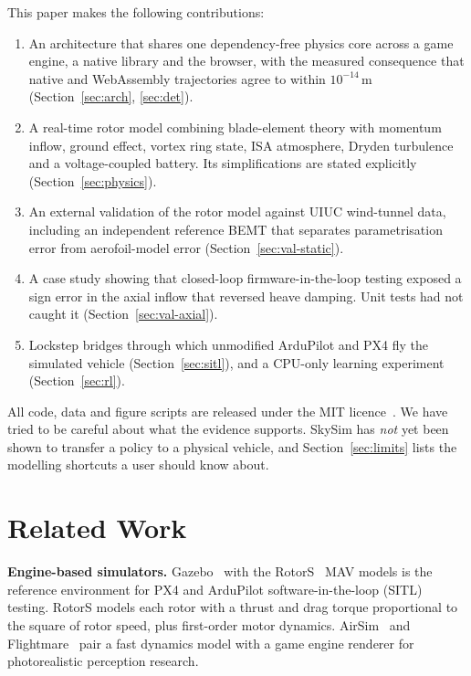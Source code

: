 \documentclass{ieeeaccess}
\newcommand{\skysim}{SkySim\xspace}
\begin{document}
This paper makes the following contributions:
\begin{enumerate}
\item An architecture that shares one dependency-free physics core across a game
engine, a native library and the browser, with the measured consequence that
native and WebAssembly trajectories agree to within $10^{-14}$\,m
(Section~\ref{sec:arch}, \ref{sec:det}).
\item A real-time rotor model combining blade-element theory with momentum
inflow, ground effect, vortex ring state, ISA atmosphere, Dryden turbulence and a
voltage-coupled battery. Its simplifications are stated explicitly
(Section~\ref{sec:physics}).
\item An external validation of the rotor model against UIUC wind-tunnel data,
including an independent reference BEMT that separates parametrisation error
from aerofoil-model error (Section~\ref{sec:val-static}).
\item A case study showing that closed-loop firmware-in-the-loop testing exposed
a sign error in the axial inflow that reversed heave damping. Unit tests had not
caught it (Section~\ref{sec:val-axial}).
\item Lockstep bridges through which unmodified ArduPilot and PX4 fly the
simulated vehicle (Section~\ref{sec:sitl}), and a CPU-only learning experiment
(Section~\ref{sec:rl}).
\end{enumerate}

All code, data and figure scripts are released under the MIT
licence~\cite{skysimrepo}. We have tried to be careful about what the evidence
supports. \skysim has \emph{not} yet been shown to transfer a policy to a
physical vehicle, and Section~\ref{sec:limits} lists the modelling shortcuts a
user should know about.

\section{Related Work}
\label{sec:related}

\textbf{Engine-based simulators.} Gazebo~\cite{koenig2004gazebo} with the
RotorS~\cite{furrer2016rotors} MAV models is the reference environment for
PX4 and ArduPilot software-in-the-loop (SITL) testing. RotorS models each rotor
with a thrust and drag torque proportional to the square of rotor speed, plus
first-order motor dynamics. AirSim~\cite{shah2018airsim} and
Flightmare~\cite{song2020flightmare} pair a fast dynamics model with a game
engine renderer for photorealistic perception research.
\end{document}
